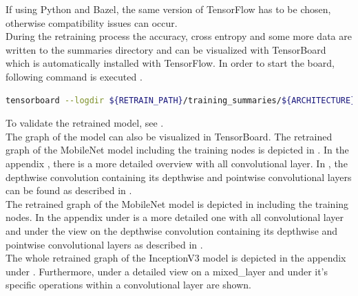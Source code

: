 If using Python and Bazel, the same version of TensorFlow has to be chosen, otherwise compatibility issues can occur. \\

During the retraining process the accuracy, cross entropy and some more data are written to the summaries directory and can be visualized with TensorBoard which is automatically installed with TensorFlow. In order to start the board, following command is executed .

\begin{minipage}{\linewidth}
\begin{lstlisting}[caption=Build and call of \textit{retrain}, label=list:tensorboard, language=bash]
	tensorboard --logdir ${RETRAIN_PATH}/training_summaries/${ARCHITECTURE}_${TRAINING_STEPS}/ &
\end{lstlisting}
\end{minipage}

To validate the retrained model, see . \\

The graph of the model can also be visualized in TensorBoard. The retrained graph of the MobileNet model including the training nodes is depicted in . In the appendix \subsecref{}, there is a more detailed overview with all convolutional layer. In \subsecref{}, the depthwise convolution containing its depthwise and pointwise convolutional layers can be found as described in . \\
The retrained graph of the MobileNet model is depicted in  including the training nodes. In the appendix under  is a more detailed one with all convolutional layer and under  the view on the depthwise convolution containing its depthwise and pointwise convolutional layers as described in . \\
The whole retrained graph of the InceptionV3 model is depicted in the appendix under . Furthermore, under  a detailed view on a mixed_layer and under  it's specific operations within a convolutional layer are shown. \\

